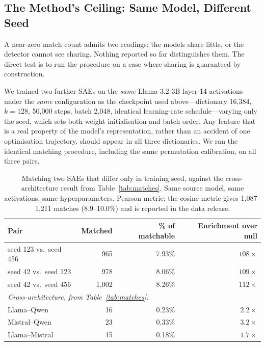 \documentclass[11pt]{article}
\begin{document}
\subsection{The Method's Ceiling: Same Model, Different Seed}
\label{sec:seedstability}

A near-zero match count admits two readings: the models share little, or the detector
cannot see sharing. Nothing reported so far distinguishes them. The direct test is to
run the procedure on a case where sharing is guaranteed by construction.

We trained two further SAEs on the \emph{same} Llama-3.2-3B layer-14 activations under
the \emph{same} configuration as the checkpoint used above---dictionary 16{,}384,
$k = 128$, 50{,}000 steps, batch 2{,}048, identical learning-rate schedule---varying
only the seed, which sets both weight initialisation and batch order. Any feature that
is a real property of the model's representation, rather than an accident of one
optimisation trajectory, should appear in all three dictionaries. We ran the
identical matching procedure, including the same permutation calibration, on all three
pairs.

\begin{table}[t]
  \centering
  \caption{Matching two SAEs that differ only in training seed, against the
    cross-architecture result from Table~\ref{tab:matches}. Same source model, same
    activations, same hyperparameters. Pearson metric; the cosine metric gives
    1{,}087--1{,}211 matches (8.9--10.0\%) and is reported in the data release.}
  \label{tab:seedstability}
  \smallskip
  \begin{tabular}{lrrr}
    \toprule
    Pair & Matched & \% of matchable & Enrichment over null \\
    \midrule
    seed 123 vs.\ seed 456   &   965 & 7.93\% & $108\times$ \\
    seed 42 vs.\ seed 123    &   978 & 8.06\% & $109\times$ \\
    seed 42 vs.\ seed 456    & 1{,}002 & 8.26\% & $112\times$ \\
    \midrule
    \multicolumn{4}{l}{\emph{Cross-architecture, from Table~\ref{tab:matches}:}} \\
    Llama--Qwen              &    16 & 0.23\% & $2.2\times$ \\
    Mistral--Qwen            &    23 & 0.33\% & $3.2\times$ \\
    Llama--Mistral           &    15 & 0.18\% & $1.7\times$ \\
    \bottomrule
  \end{tabular}
\end{table}
\end{document}
